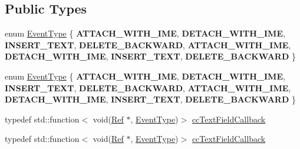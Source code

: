 \subsection*{Public Types}
\begin{DoxyCompactItemize}
\item 
enum \hyperlink{classui_1_1TextField_aaa8ec638be6efea053beb57e5382ade9}{Event\+Type} \{ \newline
{\bfseries A\+T\+T\+A\+C\+H\+\_\+\+W\+I\+T\+H\+\_\+\+I\+ME}, 
{\bfseries D\+E\+T\+A\+C\+H\+\_\+\+W\+I\+T\+H\+\_\+\+I\+ME}, 
{\bfseries I\+N\+S\+E\+R\+T\+\_\+\+T\+E\+XT}, 
{\bfseries D\+E\+L\+E\+T\+E\+\_\+\+B\+A\+C\+K\+W\+A\+RD}, 
\newline
{\bfseries A\+T\+T\+A\+C\+H\+\_\+\+W\+I\+T\+H\+\_\+\+I\+ME}, 
{\bfseries D\+E\+T\+A\+C\+H\+\_\+\+W\+I\+T\+H\+\_\+\+I\+ME}, 
{\bfseries I\+N\+S\+E\+R\+T\+\_\+\+T\+E\+XT}, 
{\bfseries D\+E\+L\+E\+T\+E\+\_\+\+B\+A\+C\+K\+W\+A\+RD}
 \}
\item 
enum \hyperlink{classui_1_1TextField_aaa8ec638be6efea053beb57e5382ade9}{Event\+Type} \{ \newline
{\bfseries A\+T\+T\+A\+C\+H\+\_\+\+W\+I\+T\+H\+\_\+\+I\+ME}, 
{\bfseries D\+E\+T\+A\+C\+H\+\_\+\+W\+I\+T\+H\+\_\+\+I\+ME}, 
{\bfseries I\+N\+S\+E\+R\+T\+\_\+\+T\+E\+XT}, 
{\bfseries D\+E\+L\+E\+T\+E\+\_\+\+B\+A\+C\+K\+W\+A\+RD}, 
\newline
{\bfseries A\+T\+T\+A\+C\+H\+\_\+\+W\+I\+T\+H\+\_\+\+I\+ME}, 
{\bfseries D\+E\+T\+A\+C\+H\+\_\+\+W\+I\+T\+H\+\_\+\+I\+ME}, 
{\bfseries I\+N\+S\+E\+R\+T\+\_\+\+T\+E\+XT}, 
{\bfseries D\+E\+L\+E\+T\+E\+\_\+\+B\+A\+C\+K\+W\+A\+RD}
 \}
\item 
typedef std\+::function$<$ void(\hyperlink{classRef}{Ref} $\ast$, \hyperlink{classui_1_1TextField_aaa8ec638be6efea053beb57e5382ade9}{Event\+Type})$>$ \hyperlink{classui_1_1TextField_a8b58cb15659d59187cfa0586d1420f1f}{cc\+Text\+Field\+Callback}
\item 
typedef std\+::function$<$ void(\hyperlink{classRef}{Ref} $\ast$, \hyperlink{classui_1_1TextField_aaa8ec638be6efea053beb57e5382ade9}{Event\+Type})$>$ \hyperlink{classui_1_1TextField_a8b58cb15659d59187cfa0586d1420f1f}{cc\+Text\+Field\+Callback}
\end{DoxyCompactItemize}
